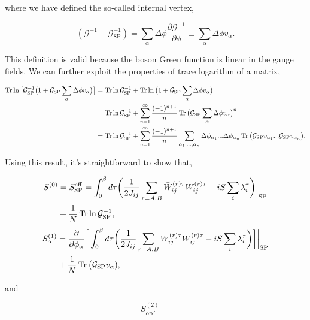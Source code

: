 \documentclass{article}
\begin{document}
where we have defined the so-called internal vertex, 

\begin{equation}
(\mathcal{G}^{-1}-\mathcal{G}_{\text{SP}}^{-1})=\sum_{\alpha}\Delta\phi\frac{\partial\mathcal{G}^{-1}}{\partial\phi}\equiv\sum_{\alpha}\Delta\phi v_{\alpha}.
\end{equation}

This definition is valid because the boson Green function is linear
in the gauge fields. We can further exploit the properties of trace
logarithm of a matrix, 

\begin{align}
\Tr\ln\big[\mathcal{G}_{\text{SP}}^{-1}\big(1+\mathcal{G}_{\text{SP}}\sum_{\alpha}\Delta\phi v_{\alpha}\big)\big] & =\Tr\ln\mathcal{G}_{\text{SP}}^{-1}+\Tr\ln\big(1+\mathcal{G}_{\text{SP}}\sum_{\alpha}\Delta\phi v_{\alpha}\big)\nonumber \\
 & =\Tr\ln\mathcal{G}_{\text{SP}}^{-1}+\sum_{n=1}^{\infty}\frac{(-1)^{n+1}}{n}\Tr\big(\mathcal{G}_{\text{SP}}\sum_{\alpha}\Delta\phi v_{\alpha}\big)^{n}\nonumber \\
 & =\Tr\ln\mathcal{G}_{\text{SP}}^{-1}+\sum_{n=1}^{\infty}\frac{(-1)^{n+1}}{n}\sum_{\alpha_{1},...,\alpha_{n}}\Delta\phi_{\alpha_{1}}...\Delta\phi_{\alpha_{n}}\Tr\big(\mathcal{G}_{\text{SP}}v_{\alpha_{1}}...\mathcal{G}_{\text{SP}}v_{\alpha_{n}}\big).
\end{align}

Using this result, it's straightforward to show that, 

\begin{align}
S^{(0)} & =S_{\text{SP}}^{\text{eff}}=\int_{0}^{\beta}d\tau\bigg(\frac{1}{2J_{ij}}\sum_{r=A,B}\bar{W}_{ij}^{(r)\tau}W_{ij}^{(r)\tau}-iS\sum_{i}\lambda_{i}^{\tau}\bigg)\bigg|_{\text{SP}}\nonumber \\
 & +\frac{1}{N}\Tr\ln\mathcal{G}_{\text{SP}}^{-1},
\end{align}
\begin{align}
S_{\alpha}^{(1)} & =\frac{\partial}{\partial\phi_{\alpha}}\bigg[\int_{0}^{\beta}d\tau\bigg(\frac{1}{2J_{ij}}\sum_{r=A,B}\bar{W}_{ij}^{(r)\tau}W_{ij}^{(r)\tau}-iS\sum_{i}\lambda_{i}^{\tau}\bigg)\bigg]\bigg|_{\text{SP}}\nonumber \\
 & +\frac{1}{N}\Tr\big(\mathcal{G}_{\text{SP}}v_{\alpha}),
\end{align}

and

\begin{equation}
S_{\alpha\alpha'}^{(2)}=
\end{equation}

%
%
\end{document}
